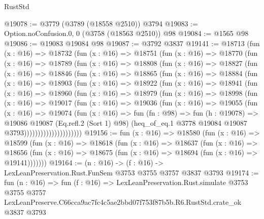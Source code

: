 \begin{lexlean}{RustStd}
\begin{coremodule}
@19078 := @3779 (@3789 (@18558 @2510)) @3794
@19083 := Option.noConfusion.{0, 0} (@3758 (@18563 @2510)) @98
@19084 := @1565 @98
@19086 := @19083 @19084 @98
@19087 := @3792 @3837
@19141 := @18713
    (fun (x : @16) =>
    @18732
      (fun (x : @16) =>
      @18751
        (fun (x : @16) =>
        @18770
          (fun (x : @16) =>
          @18789
            (fun (x : @16) =>
            @18808
              (fun (x : @16) =>
              @18827
                (fun (x : @16) =>
                @18846
                  (fun (x : @16) =>
                  @18865
                    (fun (x : @16) =>
                    @18884
                      (fun (x : @16) =>
                      @18903
                        (fun (x : @16) =>
                        @18922
                          (fun (x : @16) =>
                          @18941
                            (fun (x : @16) =>
                            @18960
                              (fun (x : @16) =>
                              @18979
                                (fun (x : @16) =>
                                @18998
                                  (fun (x : @16) =>
                                  @19017
                                    (fun (x : @16) =>
                                    @19036
                                      (fun (x : @16) =>
                                      @19055
                                        (fun (x : @16) =>
                                        @19074
                                          (fun (x : @16) =>
                                          fun (fn : @98) =>
                                          fun (h : @19078) =>
                                          @19086
                                            @19087
                                            (Eq.refl.{2} (Sort 1) @98)
                                            (heq_of_eq.{1}
                                              @3778
                                              @19084
                                              @19087
                                              @3793)))))))))))))))))))))
@19156 := fun (x : @16) =>
  @18580
    (fun (x : @16) =>
    @18599
      (fun (x : @16) =>
      @18618
        (fun (x : @16) =>
        @18637
          (fun (x : @16) =>
          @18656 (fun (x : @16) => @18675 (fun (x : @16) => @18694 (fun (x : @16) => @19141)))))))
@19164 := (n : @16) -> (f : @16) -> LexLeanPreservation.Rust.FunSem @3753 @3755 @3757 @3837 @3793
@19174 := fun (n : @16) =>
  fun (f : @16) =>
  LexLeanPreservation.Rust.simulate
    @3753
    @3755
    @3757
    LexLeanPreserve.C66cca9ac7fc4c5ae2bbd07f753f87b5b.R6.RustStd.crate_ok
    @3837
    @3793
\end{coremodule}
\end{lexlean}
